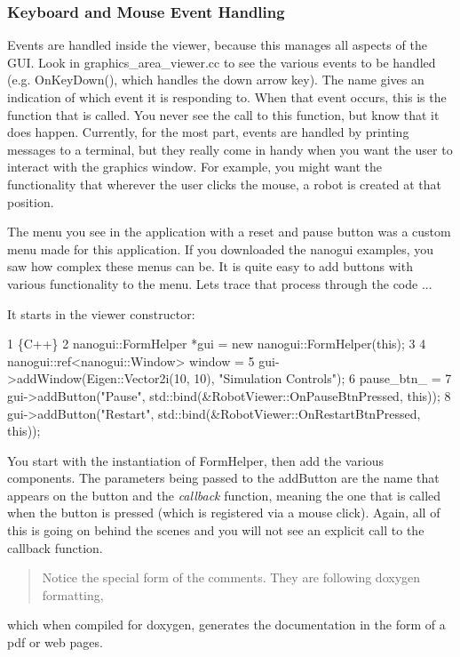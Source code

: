 \subsubsection*{Keyboard and Mouse Event Handling}

Events are handled inside the viewer, because this manages all aspects of the G\+UI. Look in graphics\+\_\+area\+\_\+viewer.\+cc to see the various events to be handled (e.\+g. On\+Key\+Down(), which handles the down arrow key). The name gives an indication of which event it is responding to. When that event occurs, this is the function that is called. You never see the call to this function, but know that it does happen. Currently, for the most part, events are handled by printing messages to a terminal, but they really come in handy when you want the user to interact with the graphics window. For example, you might want the functionality that wherever the user clicks the mouse, a robot is created at that position.

The menu you see in the application with a reset and pause button was a custom menu made for this application. If you downloaded the nanogui examples, you saw how complex these menus can be. It is quite easy to add buttons with various functionality to the menu. Let\textquotesingle{}s trace that process through the code ...

It starts in the viewer constructor\+:


\begin{DoxyCode}
1 \{C++\}
2 nanogui::FormHelper *gui = new nanogui::FormHelper(this);
3 
4 nanogui::ref<nanogui::Window> window =
5     gui->addWindow(Eigen::Vector2i(10, 10), "Simulation Controls");
6 pause\_btn\_ =
7     gui->addButton("Pause", std::bind(&RobotViewer::OnPauseBtnPressed, this));
8 gui->addButton("Restart", std::bind(&RobotViewer::OnRestartBtnPressed, this));
\end{DoxyCode}


You start with the instantiation of Form\+Helper, then add the various components. The parameters being passed to the {\ttfamily add\+Button} are the name that appears on the button and the {\itshape callback} function, meaning the one that is called when the button is pressed (which is registered via a mouse click). Again, all of this is going on behind the scenes and you will not see an explicit call to the callback function.

\begin{quote}
Notice the special form of the comments. They are following doxygen formatting, \end{quote}
which when compiled for doxygen, generates the documentation in the form of a pdf or web pages. 